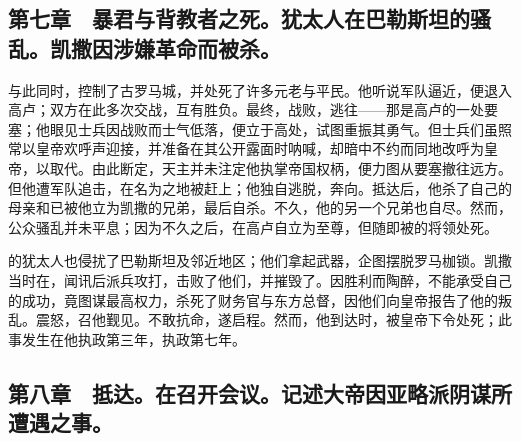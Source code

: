 
\subsection{第七章　暴君与背教者之死。犹太人在巴勒斯坦的骚乱。凯撒因涉嫌革命而被杀。}

与此同时，控制了古罗马城，并处死了许多元老与平民。他听说军队逼近，便退入高卢；双方在此多次交战，互有胜负。最终，战败，逃往——那是高卢的一处要塞；他眼见士兵因战败而士气低落，便立于高处，试图重振其勇气。但士兵们虽照常以皇帝欢呼声迎接，并准备在其公开露面时呐喊，却暗中不约而同地改呼为皇帝，以取代。由此断定，天主并未注定他执掌帝国权柄，便力图从要塞撤往远方。但他遭军队追击，在名为之地被赶上；他独自逃脱，奔向。抵达后，他杀了自己的母亲和已被他立为凯撒的兄弟，最后自杀。不久，他的另一个兄弟也自尽。然而，公众骚乱并未平息；因为不久之后，在高卢自立为至尊，但随即被的将领处死。\par

的犹太人也侵扰了巴勒斯坦及邻近地区；他们拿起武器，企图摆脱罗马枷锁。凯撒当时在，闻讯后派兵攻打，击败了他们，并摧毁了。因胜利而陶醉，不能承受自己的成功，竟图谋最高权力，杀死了财务官与东方总督，因他们向皇帝报告了他的叛乱。震怒，召他觐见。不敢抗命，遂启程。然而，他到达时，被皇帝下令处死；此事发生在他执政第三年，执政第七年。\par


\subsection{第八章　抵达。在召开会议。记述大帝因亚略派阴谋所遭遇之事。}

